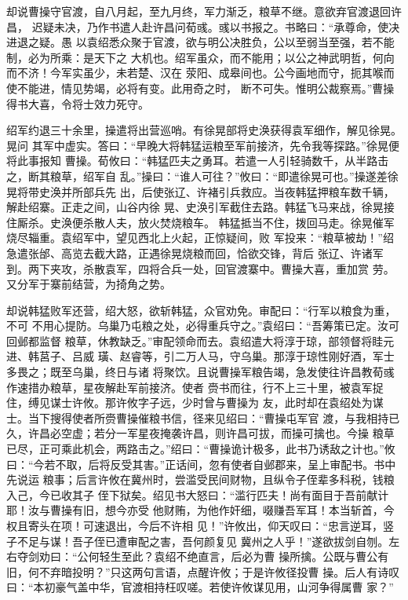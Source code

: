 却说曹操守官渡，自八月起，至九月终，军力渐乏，粮草不继。意欲弃官渡退回许昌，
迟疑未决，乃作书遣人赴许昌问荀彧。彧以书报之。书略曰：“承尊命，使决进退之疑。愚
以袁绍悉众聚于官渡，欲与明公决胜负，公以至弱当至强，若不能制，必为所乘：是天下之
大机也。绍军虽众，而不能用；以公之神武明哲，何向而不济！今军实虽少，未若楚、汉在
荥阳、成皋间也。公今画地而守，扼其喉而使不能进，情见势竭，必将有变。此用奇之时，
断不可失。惟明公裁察焉。”曹操得书大喜，令将士效力死守。

绍军约退三十余里，操遣将出营巡哨。有徐晃部将史涣获得袁军细作，解见徐晃。晃问
其军中虚实。答曰：“早晚大将韩猛运粮至军前接济，先令我等探路。”徐晃便将此事报知
曹操。荀攸曰：“韩猛匹夫之勇耳。若遣一人引轻骑数千，从半路击之，断其粮草，绍军自
乱。”操曰：“谁人可往？”攸曰：“即遣徐晃可也。”操遂差徐晃将带史涣并所部兵先
出，后使张辽、许褚引兵救应。当夜韩猛押粮车数千辆，解赴绍寨。正走之间，山谷内徐
晃、史涣引军截住去路。韩猛飞马来战，徐晃接住厮杀。史涣便杀散人夫，放火焚烧粮车。
韩猛抵当不住，拨回马走。徐晃催军烧尽辎重。袁绍军中，望见西北上火起，正惊疑间，败
军投来：“粮草被劫！”绍急遣张邰、高览去截大路，正遇徐晃烧粮而回，恰欲交锋，背后
张辽、许诸军到。两下夹攻，杀散袁军，四将合兵一处，回官渡寨中。曹操大喜，重加赏
劳。又分军于寨前结营，为掎角之势。

却说韩猛败军还营，绍大怒，欲斩韩猛，众官劝免。审配曰：“行军以粮食为重，不可
不用心提防。乌巢乃屯粮之处，必得重兵守之。”袁绍曰：“吾筹策已定。汝可回邺都监督
粮草，休教缺乏。”审配领命而去。袁绍遣大将淳于琼，部领督将眭元进、韩莒子、吕威
璜、赵睿等，引二万人马，守乌巢。那淳于琼性刚好酒，军士多畏之；既至乌巢，终日与诸
将聚饮。且说曹操军粮告竭，急发使往许昌教荀彧作速措办粮草，星夜解赴军前接济。使者
赍书而往，行不上三十里，被袁军捉住，缚见谋士许攸。那许攸字子远，少时曾与曹操为
友，此时却在袁绍处为谋士。当下搜得使者所赍曹操催粮书信，径来见绍曰：“曹操屯军官
渡，与我相持已久，许昌必空虚；若分一军星夜掩袭许昌，则许昌可拔，而操可擒也。今操
粮草已尽，正可乘此机会，两路击之。”绍曰：“曹操诡计极多，此书乃诱敌之计也。”攸
曰：“今若不取，后将反受其害。”正话间，忽有使者自邺郡来，呈上审配书。书中先说运
粮事；后言许攸在冀州时，尝滥受民间财物，且纵令子侄辈多科税，钱粮入己，今已收其子
侄下狱矣。绍见书大怒曰：“滥行匹夫！尚有面目于吾前献计耶！汝与曹操有旧，想今亦受
他财贿，为他作奸细，啜赚吾军耳！本当斩首，今权且寄头在项！可速退出，今后不许相
见！”许攸出，仰天叹曰：“忠言逆耳，竖子不足与谋！吾子侄已遭审配之害，吾何颜复见
冀州之人乎！”遂欲拔剑自刎。左右夺剑劝曰：“公何轻生至此？袁绍不绝直言，后必为曹
操所擒。公既与曹公有旧，何不弃暗投明？”只这两句言语，点醒许攸；于是许攸径投曹
操。后人有诗叹曰：“本初豪气盖中华，官渡相持枉叹嗟。若使许攸谋见用，山河争得属曹
家？”

